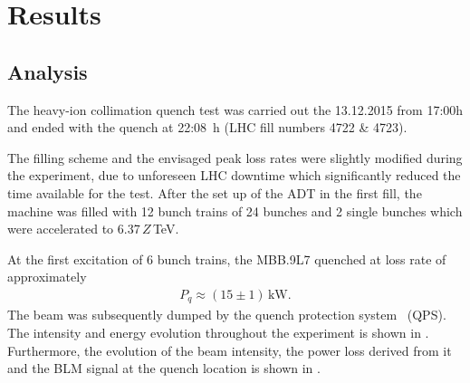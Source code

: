\section{Results}


\subsection{Analysis}

The heavy-ion collimation quench test was carried out the 13.12.2015 from 17:00h and ended with the quench at 22:08~h (LHC fill numbers 4722 \& 4723). 

The filling scheme and the envisaged peak loss rates were slightly modified during the experiment, due to unforeseen LHC downtime which significantly reduced the time available for the test. After the set up of the ADT in the first fill, the machine was filled with 12 bunch trains of 24 bunches and 2 single bunches which were accelerated to 6.37\,$Z$\,TeV. 

At the first excitation of 6 bunch trains, the MBB.9L7 quenched at loss rate of approximately 
%
\begin{align}
P_q \approx (15 \pm 1) \, \text{kW}.
\end{align} 
The beam was subsequently dumped by the quench protection system~\cite{EPAC08:WEPD010} (QPS). The intensity and energy evolution throughout the experiment is shown in . Furthermore, the evolution of the beam intensity, the power loss derived from it and the BLM signal at the quench location is shown in . 


